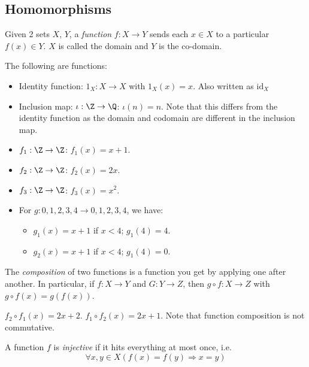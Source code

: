 \documentclass[a4paper]{article}
\begin{document}
  \subsection{Homomorphisms}
  \begin{defi}[Function]
    Given 2 sets $X$, $Y$, a \emph{function} $f: X \rightarrow Y$ sends each $x\in X$ to a particular $f(x)\in Y$. $X$ is called the domain and $Y$ is the co-domain.
  \end{defi}
  \begin{eg}
    The following are functions:
    \begin{itemize}
      \item Identity function: $1_X: X \rightarrow X$  with $1_X(x) = x$. Also written as $\mathrm{id}_X$
      \item Inclusion map: $\iota: \Z \rightarrow \Q$: $\iota(n) = n$. Note that this differs from the identity function as the domain and codomain are different in the inclusion map.
      \item $f_1: \Z \rightarrow \Z$: $f_1(x) = x + 1$.
      \item $f_2: \Z \rightarrow \Z$: $f_2(x) = 2x$.
      \item $f_3: \Z \rightarrow \Z$: $f_3(x) = x^2$.
      \item For $g: {0, 1, 2, 3, 4} \rightarrow {0, 1, 2, 3, 4}$, we have:
        \begin{itemize}
          \item $g_1(x) = x + 1$ if $x < 4$; $g_1(4) = 4$.
          \item $g_2(x) = x + 1$ if $x < 4$; $g_1(4) = 0$.
        \end{itemize}
    \end{itemize}
  \end{eg}

  \begin{defi}
    The \emph{composition} of two functions is a function you get by applying one after another. In particular, if $f: X \rightarrow Y$ and $G: Y\rightarrow Z$, then $g\circ f: X \rightarrow Z$ with $g\circ f(x) = g(f(x))$.
  \end{defi}
  \begin{eg}
    $f_2\circ f_1(x) = 2x + 2$. $f_1\circ f_2 (x) = 2x + 1$. Note that function composition is not commutative.
  \end{eg}
  \begin{defi}
    A function $f$ is \emph{injective} if it hits everything at most once, i.e.
    \[
      \forall x, y\in X(f(x) = f(y)\Rightarrow x = y)
    \]
  \end{defi}
\end{document}
